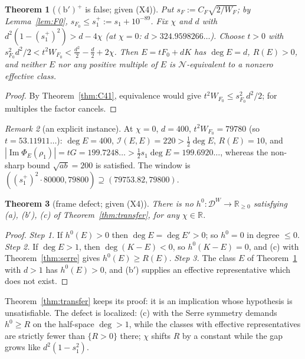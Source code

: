 \documentclass[11pt]{amsart}
\newtheorem{theorem}{Theorem}[section]
\theoremstyle{definition}
\theoremstyle{remark}
\newtheorem{remark}[theorem]{Remark}
\newcommand{\R}{\mathbb R}
\newcommand{\Iml}{\operatorname{Im}}
\newcommand{\DW}{\mathcal D^{W}}
\newcommand{\Nr}{\mathcal N}
\newcommand{\I}{\mathcal I}
\newcommand{\dg}{\deg}
\begin{document}
\begin{theorem}[$(\mathrm b')^+$ is false; given (X4)]\label{thm:bfalse}
Put $s_{F}:=C_F\sqrt{2/W_F}$; by Lemma~\ref{lem:F0}, $s_{F_0}\le s_1^+:=s_1+10^{-89}$. Fix $\chi$ and $d$ with
$d^2(1-(s_1^+)^2)>d-4\chi$ (at $\chi=0$: $d>324.9598266\ldots$). Choose $t>0$ with
$s_{F_0}^2d^2/2<t^2W_{F_0}<\frac{d^2}2-\frac d2+2\chi$. Then $E=tF_0+dK$ has $\dg E=d$, $R(E)>0$, and neither
$E$ nor any positive multiple of $E$ is $\Nr$-equivalent to a nonzero effective class.
\end{theorem}
\begin{proof}
By Theorem~\ref{thm:C41}, equivalence would give $t^2W_{F_0}\le s_{F_0}^2d^2/2$; for multiples the factor cancels.
\end{proof}

\begin{remark}[an explicit instance]
At $\chi=0$, $d=400$, $t^2W_{F_0}=79780$ (so $t=53.11911\ldots$): $\dg E=400$, $\I(E,E)=220>\frac12\dg E$,
$R(E)=10$, and $|\Iml\Phi_E(\rho_1)|=tG=199.7248\ldots>\frac12s_1\dg E=199.6920\ldots$, whereas the
non-sharp bound $\sqrt{ab}=200$ is satisfied. The window is $((s_1^+)^2\cdot80000,79800)\supseteq(79753.82,79800)$.
\end{remark}

\begin{theorem}[frame defect; given (X4)]\label{thm:defect}
There is no $h^0:\DW\to\R_{\ge0}$ satisfying (a), (b$'$), (c) of Theorem~\ref{thm:transfer}, for any $\chi\in\R$.
\end{theorem}
\begin{proof}
\emph{Step 1.} If $h^0(E)>0$ then $\dg E=\dg E'>0$; so $h^0=0$ in degree $\le0$. \emph{Step 2.} If $\dg E>1$,
then $\dg(K-E)<0$, so $h^0(K-E)=0$, and (c) with Theorem~\ref{thm:serre} gives $h^0(E)\ge R(E)$.
\emph{Step 3.} The class $E$ of Theorem~\ref{thm:bfalse} with $d>1$ has $h^0(E)>0$, and (b$'$) supplies an
effective representative which does not exist.
\end{proof}

Theorem~\ref{thm:transfer} keeps its proof: it is an implication whose hypothesis is unsatisfiable. The
defect is localized: (c) with the Serre symmetry demands $h^0\ge R$ on the half-space $\dg>1$, while the
classes with effective representatives are strictly fewer than $\{R>0\}$ there; $\chi$ shifts $R$ by a
constant while the gap grows like $d^2(1-s_1^2)$.
\end{document}
